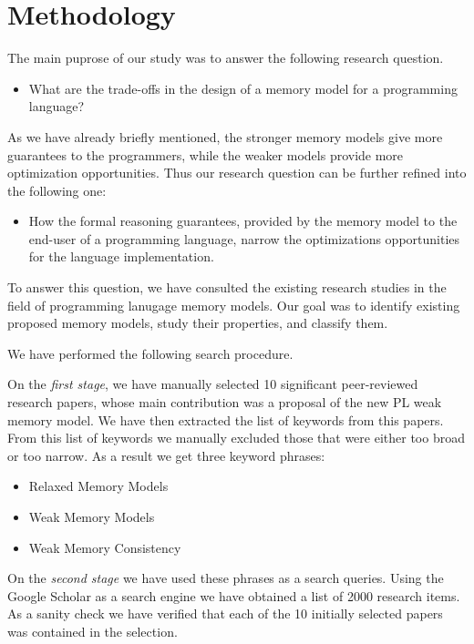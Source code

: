 \section{Methodology}

The main puprose of our study was to answer the following research question.

\begin{itemize}
  \item What are the trade-offs in the design of a memory model for a programming language?
\end{itemize}

As we have already briefly mentioned, the stronger memory models 
give more guarantees to the programmers, while the weaker models 
provide more optimization opportunities. 
Thus our research question can be further refined into the following one:

\begin{itemize}
  \item How the formal reasoning guarantees, provided by the memory model 
    to the end-user of a programming language, narrow the 
    optimizations opportunities for the language implementation. 
\end{itemize}

To answer this question, we have consulted the existing research studies 
in the field of programming lanugage memory models.
Our goal was to identify existing proposed memory models, 
study their properties, and classify them.

We have performed the following search procedure.

On the \emph{first stage}, we have manually selected 10 significant 
peer-reviewed research papers, whose main contribution 
was a proposal of the new PL weak memory model.
We have then extracted the list of keywords from this papers. 
From this list of keywords we manually excluded those 
that were either too broad or too narrow.
As a result we get three keyword phrases:
\begin{itemize}
  \item Relaxed Memory Models
  \item Weak Memory Models
  \item Weak Memory Consistency
\end{itemize}
 
On the \emph{second stage} we have used these phrases as a search queries. 
Using the Google Scholar as a search engine we have obtained a list of 2000 research items. 
As a sanity check we have verified that each of the 10 initially selected papers was contained in the selection. 

